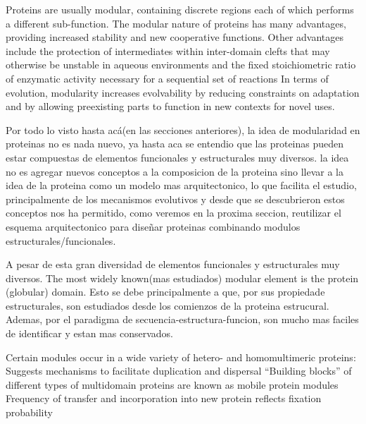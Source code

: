 Proteins are usually modular, containing discrete regions each of which performs a different sub-function. 
The modular nature of proteins has many advantages, providing increased stability and new cooperative functions.
Other advantages include the protection of intermediates within inter-domain clefts that may otherwise be unstable in aqueous environments and the fixed stoichiometric ratio of enzymatic activity necessary for a sequential set of reactions
In terms of evolution, modularity increases evolvability by reducing constraints on adaptation and by allowing preexisting parts to function in new contexts for novel uses.

Por todo lo visto hasta acá(en las secciones anteriores), la idea de modularidad en proteinas no es nada nuevo, ya hasta aca se entendio que las proteinas pueden estar compuestas de elementos funcionales y estructurales muy diversos.
la idea no es agregar nuevos conceptos a la composicion de la proteina sino llevar a la idea de la proteina como un modelo mas arquitectonico, lo que facilita el estudio, principalmente de los mecanismos evolutivos y desde que se descubrieron 
estos conceptos nos ha permitido, como veremos en la proxima seccion, reutilizar el esquema arquitectonico para diseñar proteinas combinando modulos estructurales/funcionales.


A pesar de esta gran diversidad de elementos funcionales y estructurales muy diversos.
The most widely known(mas estudiados) modular element is the protein (globular) domain. 
Esto se debe principalmente a que, por sus propiedade estructurales, son estudiados desde los comienzos de la proteina estrucural.
Ademas, por el paradigma de secuencia-estructura-funcion, son mucho mas faciles de identificar y estan mas conservados.


Certain modules occur in a wide variety of hetero- and homomultimeric proteins:
Suggests mechanisms to facilitate duplication and dispersal
“Building blocks” of different types of multidomain proteins are known as mobile protein modules
Frequency of transfer and incorporation into new protein reflects fixation probability


